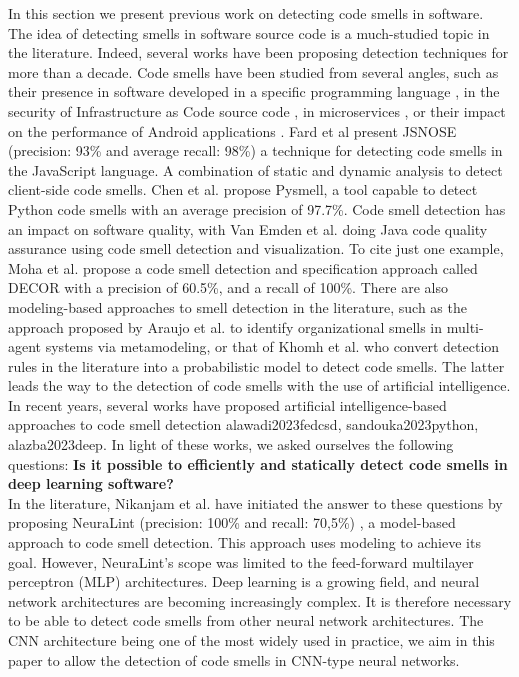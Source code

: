 \label{sec:background}
In this section we present previous work on detecting code smells in software.\\

The idea of detecting smells in software source code is a much-studied topic in
the literature. Indeed, several works have been proposing detection techniques
for more than a decade. Code smells have been studied from several angles, such
as their presence in software developed in a specific programming language
\cite{saboury2017empirical}, in the security of Infrastructure as Code source
code \cite{rahman2021security}, in microservices \cite{cernymicroservice}, or
their impact on the performance of Android applications
\cite{hecht2016empirical}. Fard et al \cite{6648192} present JSNOSE (precision:
93\% and average recall: 98\%) a technique for detecting code smells in the
JavaScript language. A combination of static and dynamic analysis to detect
client-side code smells. Chen et al. \cite{chen2016detecting} propose Pysmell, a
tool capable to detect Python code smells with an average precision of 97.7\%.
Code smell detection has an impact on software quality, with Van Emden et al.
\cite{1173068} doing Java code quality assurance using code smell detection and
visualization. To cite just one example, Moha et al. \cite{moha2010decor}
propose a code smell detection and specification approach called DECOR with a
precision of 60.5\%, and a recall of 100\%. There are also modeling-based
approaches to smell detection in the literature, such as the approach proposed
by Araujo et al. \cite{araujo2018metamodeling} to identify organizational smells
in multi-agent systems via metamodeling, or that of Khomh et al.
\cite{khomh2009bayesian} who convert detection rules in the literature into a
probabilistic model to detect code smells. The latter leads the way to the
detection of code smells with the use of artificial intelligence. In recent
years, several works have proposed artificial intelligence-based approaches to
code smell detection {alawadi2023fedcsd, sandouka2023python, alazba2023deep}. In
light of these works, we asked ourselves the following questions: \textbf{Is it
    possible to efficiently and statically detect code smells in deep learning
    software?} \\In the literature, Nikanjam et al. have initiated the answer to
these questions by proposing NeuraLint (precision: 100\% and recall: 70,5\%)
\cite{nikanjam2021automatic}, a model-based approach to code smell detection.
This approach uses modeling to achieve its goal. However, NeuraLint's scope was
limited to the feed-forward multilayer perceptron (MLP) architectures. Deep
learning is a growing field, and neural network architectures are becoming
increasingly complex. It is therefore necessary to be able to detect code smells
from other neural network architectures. The CNN architecture being one of the
most widely used in practice, we aim in this paper to allow the detection of
code smells in CNN-type neural networks.










